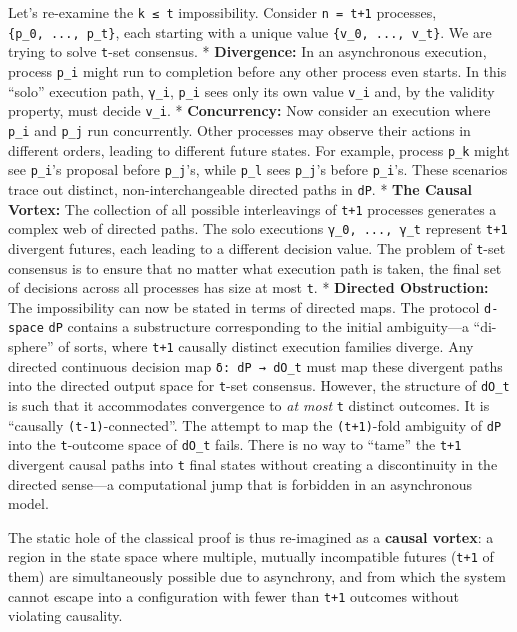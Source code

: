 \documentclass[
]{article}
\begin{document}
Let's re-examine the \texttt{k\ ≤\ t} impossibility. Consider
\texttt{n\ =\ t+1} processes, \texttt{\{p\_0,\ ...,\ p\_t\}}, each
starting with a unique value \texttt{\{v\_0,\ ...,\ v\_t\}}. We are
trying to solve \texttt{t}-set consensus. * \textbf{Divergence:} In an
asynchronous execution, process \texttt{p\_i} might run to completion
before any other process even starts. In this ``solo'' execution path,
\texttt{γ\_i}, \texttt{p\_i} sees only its own value \texttt{v\_i} and,
by the validity property, must decide \texttt{v\_i}. *
\textbf{Concurrency:} Now consider an execution where \texttt{p\_i} and
\texttt{p\_j} run concurrently. Other processes may observe their
actions in different orders, leading to different future states. For
example, process \texttt{p\_k} might see \texttt{p\_i}'s proposal before
\texttt{p\_j}'s, while \texttt{p\_l} sees \texttt{p\_j}'s before
\texttt{p\_i}'s. These scenarios trace out distinct, non-interchangeable
directed paths in \texttt{dP}. * \textbf{The Causal Vortex:} The
collection of all possible interleavings of \texttt{t+1} processes
generates a complex web of directed paths. The solo executions
\texttt{γ\_0,\ ...,\ γ\_t} represent \texttt{t+1} divergent futures,
each leading to a different decision value. The problem of
\texttt{t}-set consensus is to ensure that no matter what execution path
is taken, the final set of decisions across all processes has size at
most \texttt{t}. * \textbf{Directed Obstruction:} The impossibility can
now be stated in terms of directed maps. The protocol \texttt{d-space}
\texttt{dP} contains a substructure corresponding to the initial
ambiguity---a ``di-sphere'' of sorts, where \texttt{t+1} causally
distinct execution families diverge. Any directed continuous decision
map \texttt{δ:\ dP\ →\ dO\_t} must map these divergent paths into the
directed output space for \texttt{t}-set consensus. However, the
structure of \texttt{dO\_t} is such that it accommodates convergence to
\emph{at most} \texttt{t} distinct outcomes. It is ``causally
\texttt{(t-1)}-connected''. The attempt to map the \texttt{(t+1)}-fold
ambiguity of \texttt{dP} into the \texttt{t}-outcome space of
\texttt{dO\_t} fails. There is no way to ``tame'' the \texttt{t+1}
divergent causal paths into \texttt{t} final states without creating a
discontinuity in the directed sense---a computational jump that is
forbidden in an asynchronous model.

The static hole of the classical proof is thus re-imagined as a
\textbf{causal vortex}: a region in the state space where multiple,
mutually incompatible futures (\texttt{t+1} of them) are simultaneously
possible due to asynchrony, and from which the system cannot escape into
a configuration with fewer than \texttt{t+1} outcomes without violating
causality.
\end{document}
